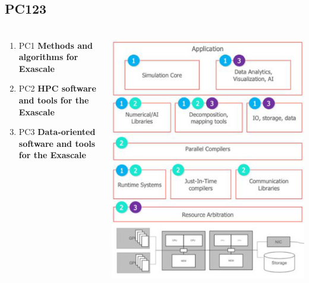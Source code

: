 \subsection{PC123}

\begin{frame}
  \frametitle{\insertsectionhead}
  \framesubtitle{\insertsubsectionhead}
  \begin{columns}
    \begin{column}{0.5\textwidth}
      \begin{alertblock}{}

      \begin{enumerate}
        \item \alert{PC1} \textbf{Methods and algorithms for
        Exascale}
        \item \alert{PC2} \textbf{HPC software and tools for the
        Exascale}
        \item \alert{PC3} \textbf{Data-oriented software and tools
        for the Exascale}
      \end{enumerate}
              
    \end{alertblock}
    \end{column}
    \begin{column}{.5\textwidth}
      \includegraphics[height=.76\paperheight]{../figures/numpex-ip123.png}
    \end{column}
  \end{columns}
  
\end{frame}

